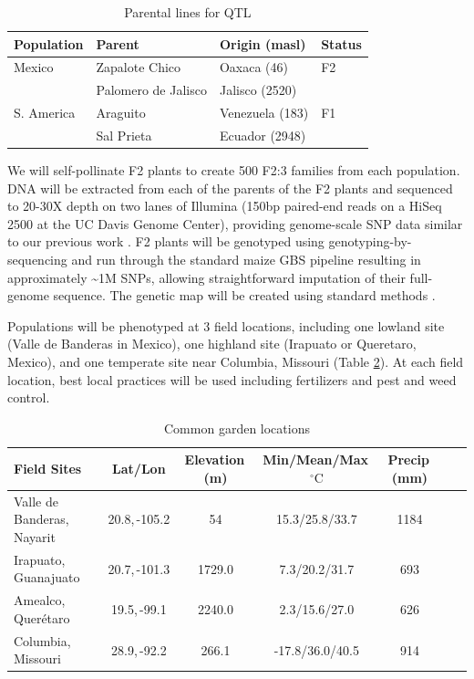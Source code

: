 \begin{table}
\begin{center}
\caption{Parental lines for QTL} \label{tab:qtlpops}
\begin{tabular}{llll}\\\toprule  
{\bf Population}	& {\bf Parent } &	{\bf Origin (masl)} & {\bf Status }\\ \midrule
 \rowcolor{gray!25}
Mexico	& Zapalote Chico		& Oaxaca	 (46)		&  F2 \\ 
 \rowcolor{gray!25}
	& 	Palomero de Jalisco	& 	Jalisco (2520)		& \\
S. America	& Araguito	& Venezuela (183)	&  F1 \\ 
	& Sal Prieta	 & Ecuador (2948) & \\ \bottomrule
\end{tabular}
\end{center}
\end{table} 

We will self-pollinate F2 plants to create 500 F2:3 families from each population.  DNA will be extracted from each of the parents of the F2 plants and sequenced to 20-30X depth on two lanes of Illumina (150bp paired-end reads on a HiSeq 2500 at the UC Davis Genome Center), providing genome-scale SNP data similar to our previous work \citep[HapMap.v2;][]{Chia2012a}.  F2 plants will be genotyped using genotyping-by-sequencing \citep[GBS;][]{Elshire2011} and run through the standard maize GBS pipeline \citep{Glaubitz2014} resulting in approximately \textasciitilde 1M SNPs, allowing straightforward imputation of their full-genome sequence.  The genetic map will be created using standard methods \citep[e.g.][]{Broman2003a}. 

Populations will be phenotyped at 3 field locations, including one lowland site (Valle de Banderas in Mexico), one highland site (Irapuato or Queretaro, Mexico), and one temperate site near Columbia, Missouri (Table \ref{tab:locales}).  At each field location, best local practices will be used including fertilizers and pest and weed control.

\begin{table}
\begin{center}
\caption{Common garden locations} \label{tab:locales}
\begin{tabular}{p{2cm}cccccc}\\\toprule  
{\bf Field Sites} & {\bf Lat/Lon } & {\bf Elevation\,(m) } &	{\bf Min/Mean/Max\,$^{\circ}\mathrm{C}$  } & {\bf Precip\,(mm) } \\ \toprule
Valle de Banderas, Nayarit	& 20.8,\,-105.2&	54		&	15.3/25.8/33.7	&	1184 \\
Irapuato, Guanajuato 	&	20.7,\,-101.3	&	1729.0	&	7.3/20.2/31.7	&	693 \\
Amealco, Quer\'etaro 	&	19.5,\,-99.1	&	2240.0 	&	2.3/15.6/27.0	&	626\\
Columbia, Missouri		& 	28.9,\,-92.2	&	266.1 	&	-17.8/36.0/40.5&	914\\ \bottomrule
\end{tabular}
\end{center}
\end{table} 

